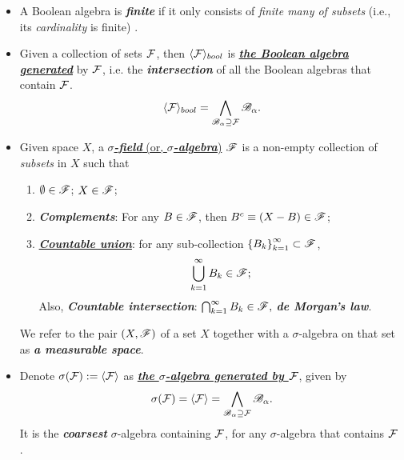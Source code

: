 \documentclass[11pt]{article}
\begin{document}
\begin{itemize}
\item \begin{definition}
A Boolean algebra is \emph{\textbf{finite}} if it only consists of \emph{finite many of subsets} (i.e., its \emph{cardinality} is finite)  \citep{tao2011introduction}.  
\end{definition}

\item \begin{definition}
Given a collection of sets ${\mathcal F}$, then $\langle {\mathcal F} \rangle_{bool}$ is \underline{\emph{\textbf{the Boolean algebra generated}}} by ${\mathcal F}$, i.e. the \emph{\textbf{intersection}} of all the Boolean algebras that contain ${\mathcal F}$. 
\begin{align*}
\langle {\mathcal F} \rangle_{bool} = \bigwedge_{{\mathscr B}_{\alpha} \supseteq {\mathcal F}}{\mathscr B}_{\alpha}.
\end{align*} 
\end{definition}

\item
\begin{definition}
 Given space $X$, a \underline{\emph{\textbf{$\sigma$-field}} (or, \emph{\textbf{$\sigma$-algebra}})} ${\mathscr F}$ is a non-empty collection of \emph{subsets} in $X$ such that 
\begin{enumerate}
\item $\emptyset \in {\mathscr F}$; $X\in {\mathscr F}$;
\item \emph{\textbf{Complements}}:  For any $B\in {\mathscr F}$, then $B^{c}\equiv (X-B) \in {\mathscr F}$;
\item \underline{\emph{\textbf{Countable union}}}: for any sub-collection $\left\{B_{k}\right\}_{k=1}^{\infty} \subset {\mathscr F}$, 
\begin{align*}
\bigcup_{k=1}^{\infty}B_{k} \in {\mathscr F};
\end{align*} 
Also, \emph{\textbf{Countable intersection}}: $\bigcap_{k=1}^{\infty}B_{k} \in {\mathscr F},$ \emph{\textbf{de Morgan's law}}.
\end{enumerate} 
We refer to the pair $(X, {\mathscr F})$ of a set $X$ together with a $\sigma$-algebra on that set as \emph{\textbf{a measurable space}}.
\end{definition}

\item
\begin{definition}
Denote $\sigma({\mathcal F}) := \langle {\mathcal F} \rangle$ as  \underline{\emph{\textbf{the $\sigma$-algebra generated by ${\mathcal F}$}}}, given by 
\begin{align*}
\sigma({\mathcal F}) = \langle {\mathcal F} \rangle = \bigwedge_{{\mathscr B}_{\alpha} \supseteq {\mathcal F}}{\mathscr B}_{\alpha}.
\end{align*}
 It is the  \emph{\textbf{coarsest}} $\sigma$-algebra containing ${\mathcal F}$, for any $\sigma$-algebra that contains ${\mathcal F}$  . 
\end{definition}


\end{itemize}
\end{document}
